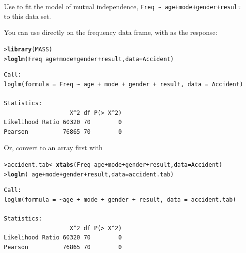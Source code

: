 \documentclass[10pt]{report}\usepackage[]{graphicx}\usepackage[]{color}
\makeatletter
\newcommand{\hlopt}[1]{\textcolor[rgb]{0,0,0}{#1}}%
\newcommand{\hlstd}[1]{\textcolor[rgb]{0.345,0.345,0.345}{#1}}%
\newcommand{\hlkwb}[1]{\textcolor[rgb]{0.69,0.353,0.396}{#1}}%
\newcommand{\hlkwc}[1]{\textcolor[rgb]{0.333,0.667,0.333}{#1}}%
\newcommand{\hlkwd}[1]{\textcolor[rgb]{0.737,0.353,0.396}{\textbf{#1}}}%
\newenvironment{kframe}{%
 \def\at@end@of@kframe{}%
 \ifinner\ifhmode%
  \def\at@end@of@kframe{\end{minipage}}%
  \begin{minipage}{\columnwidth}%
 \fi\fi%
 \def\FrameCommand##1{\hskip\@totalleftmargin \hskip-\fboxsep
 \colorbox{shadecolor}{##1}\hskip-\fboxsep
     \hskip-\linewidth \hskip-\@totalleftmargin \hskip\columnwidth}%
 \MakeFramed {\advance\hsize-\width
   \@totalleftmargin\z@ \linewidth\hsize
   \@setminipage}}%
 {\par\unskip\endMakeFramed%
 \at@end@of@kframe}
\newenvironment{knitrout}{}{} %
\renewenvironment{knitrout}{\small\renewcommand{\baselinestretch}{.85}}{} %
\makeatother
\begin{document}
\begin{Exercises}
\begin{enumerate*}
      \item Use  to fit the model of mutual independence, \verb|Freq ~ age+mode+gender+result| to
      this data set.
      \begin{ans}
      You can use  directly on the frequency data frame, with  as the response:
\begin{knitrout}\footnotesize
{}\color{fgcolor}\begin{kframe}
\begin{alltt}
\hlstd{> }\hlkwd{library}\hlstd{(MASS)}
\hlstd{> }\hlkwd{loglm}\hlstd{(Freq} \hlopt{~} \hlstd{age} \hlopt{+} \hlstd{mode} \hlopt{+} \hlstd{gender} \hlopt{+} \hlstd{result,} \hlkwc{data} \hlstd{= Accident)}
\end{alltt}
\begin{verbatim}
Call:
loglm(formula = Freq ~ age + mode + gender + result, data = Accident)

Statistics:
                   X^2 df P(> X^2)
Likelihood Ratio 60320 70        0
Pearson          76865 70        0
\end{verbatim}
\end{kframe}
\end{knitrout}
      Or, convert to an array first with 
\begin{knitrout}\footnotesize
{}\color{fgcolor}\begin{kframe}
\begin{alltt}
\hlstd{> }\hlstd{accident.tab} \hlkwb{<-} \hlkwd{xtabs}\hlstd{(Freq} \hlopt{~} \hlstd{age} \hlopt{+} \hlstd{mode} \hlopt{+} \hlstd{gender} \hlopt{+} \hlstd{result,} \hlkwc{data} \hlstd{= Accident)}
\hlstd{> }\hlkwd{loglm}\hlstd{(}\hlopt{~} \hlstd{age} \hlopt{+} \hlstd{mode} \hlopt{+} \hlstd{gender} \hlopt{+} \hlstd{result,} \hlkwc{data} \hlstd{= accident.tab)}
\end{alltt}
\begin{verbatim}
Call:
loglm(formula = ~age + mode + gender + result, data = accident.tab)

Statistics:
                   X^2 df P(> X^2)
Likelihood Ratio 60320 70        0
Pearson          76865 70        0
\end{verbatim}
\end{kframe}
\end{knitrout}
      \end{ans}
      

\end{enumerate*}
\end{Exercises}
\end{document}
